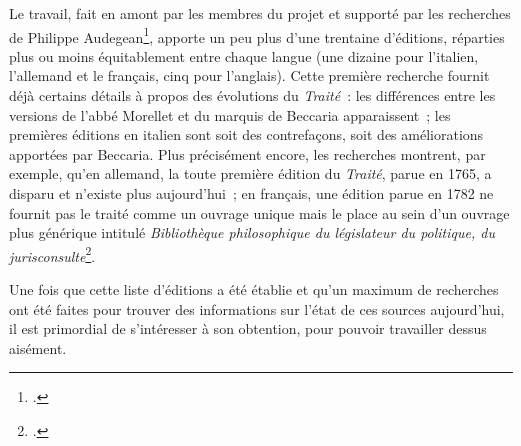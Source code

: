 Le travail, fait en amont par les membres du projet et supporté par les recherches de Philippe Audegean\footcite{beccaria_audegean_2009}, apporte un peu plus d'une trentaine d'éditions, réparties plus ou moins équitablement entre chaque langue (une dizaine pour l'italien, l'allemand et le français, cinq pour l'anglais). Cette première recherche fournit déjà certains détails à propos des évolutions du \emph{Traité}~: les différences entre les versions de l'abbé Morellet et du marquis de Beccaria apparaissent~; les premières éditions en italien sont soit des contrefaçons, soit des améliorations apportées par Beccaria. Plus précisément encore, les recherches montrent, par exemple, qu'en allemand, la toute première édition du \emph{Traité}, parue en 1765, a disparu et n'existe plus aujourd'hui~; en français, une édition parue en 1782 ne fournit pas le traité comme un ouvrage unique mais le place au sein d'un ouvrage plus générique intitulé \emph{Bibliothèque philosophique du législateur du politique, du jurisconsulte}\footcite{fr2-2}.

\begin{landscape}
\pagestyle{empty}

\label{table:editions}
\end{landscape}

Une fois que cette liste d'éditions a été établie et qu'un maximum de recherches ont été faites pour trouver des informations sur l'état de ces sources aujourd'hui, il est primordial de s'intéresser à son obtention, pour pouvoir travailler dessus aisément.

